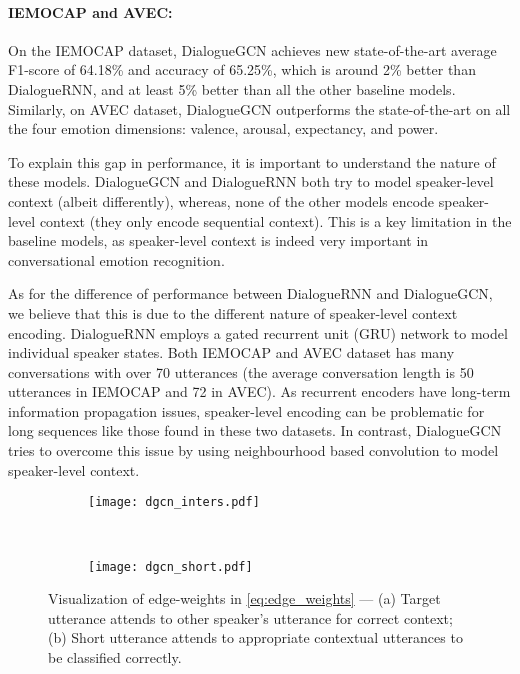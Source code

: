\documentclass[11pt,a4paper]{article}
\begin{document}
\paragraph{IEMOCAP and AVEC:} On the IEMOCAP dataset, DialogueGCN achieves new state-of-the-art average F1-score of 64.18\% and accuracy of 65.25\%, which is around 2\% better than DialogueRNN, and at least 5\% better than all the other baseline models. 
Similarly, on AVEC dataset, DialogueGCN outperforms the state-of-the-art on all the four emotion dimensions: valence, arousal, expectancy, and power.

To explain this gap in performance, it is important to understand the nature of these models. DialogueGCN and DialogueRNN both try to model speaker-level context (albeit differently), whereas, none of the other models encode speaker-level context (they only encode sequential context). This is a key limitation in the baseline models, as speaker-level context is indeed very important in conversational emotion recognition. 

As for the difference of performance between DialogueRNN and DialogueGCN, we believe that this is due to the different nature of speaker-level context encoding. DialogueRNN employs a gated recurrent unit (GRU) network to model individual speaker states. Both IEMOCAP and AVEC dataset has many conversations with over 70 utterances (the average conversation length is 50 utterances in IEMOCAP and 72 in AVEC). As recurrent encoders have long-term information propagation issues, speaker-level encoding can be problematic for long sequences like those found in these two datasets. In contrast, DialogueGCN tries to overcome this issue by using neighbourhood based convolution to model speaker-level context. 
\begin{figure*}[t]
    \centering
    \begin{subfigure}[t]{0.47\textwidth}
        \centering
        \texttt{[image: dgcn\_inters.pdf]}
        \caption{}
        \label{fig:dgcn_inters}
    \end{subfigure}
    ~
    \begin{subfigure}[t]{0.47\textwidth}
        \centering
        \texttt{[image: dgcn\_short.pdf]}
        \caption{}
        \label{fig:dgcn_short}
    \end{subfigure}
        \caption{Visualization of edge-weights in \cref{eq:edge_weights} --- (a) Target utterance attends to other speaker's utterance for correct context; (b) Short utterance attends to appropriate contextual utterances to be classified correctly. }
\end{figure*}
\end{document}
